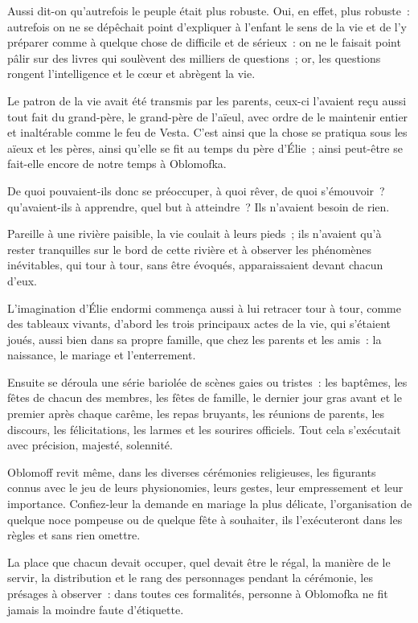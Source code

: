 \documentclass[french,twoside]{book} %
\begin{document}
Aussi dit-on qu’autrefois le peuple était plus robuste. Oui, en effet, plus robuste : autrefois on ne se dépêchait point d’expliquer à l’enfant le sens de la vie et de l’y préparer comme à quelque chose de difficile et de sérieux : on ne le faisait point pâlir sur des livres qui soulèvent des milliers de questions ; or, les questions rongent l’intelligence et le cœur et abrègent la vie.\par
Le patron de la vie avait été transmis par les parents, ceux-ci l’avaient reçu aussi tout fait du grand-père, le grand-père de l’aïeul, avec ordre de le maintenir entier et inaltérable comme le feu de Vesta. C’est ainsi que la chose se pratiqua sous les aïeux et les pères, ainsi qu’elle se fit au temps du père d’Élie ; ainsi peut-être se fait-elle encore de notre temps à Oblomofka.\par
De quoi pouvaient-ils donc se préoccuper, à quoi rêver, de quoi s’émouvoir ? qu’avaient-ils à apprendre, quel but à atteindre ? Ils n’avaient besoin de rien.\par
Pareille à une rivière paisible, la vie coulait à leurs pieds ; ils n’avaient qu’à rester tranquilles sur le bord de cette rivière et à observer les phénomènes inévitables, qui tour à tour, sans être évoqués, apparaissaient devant chacun d’eux.\par
L’imagination d’Élie endormi commença aussi à lui retracer tour à tour, comme des tableaux vivants, d’abord les trois principaux actes de la vie, qui s’étaient joués, aussi bien dans sa propre famille, que chez les parents et les amis : la naissance, le mariage et l’enterrement.\par
Ensuite se déroula une série bariolée de scènes gaies ou tristes : les baptêmes, les fêtes de chacun des membres, les fêtes de famille, le dernier jour gras avant et le premier après chaque carême, les repas bruyants, les réunions de parents, les discours, les félicitations, les larmes et les sourires officiels. Tout cela s’exécutait avec précision, majesté, solennité.\par
Oblomoff revit même, dans les diverses cérémonies religieuses, les figurants connus avec le jeu de leurs physionomies, leurs gestes, leur empressement et leur importance. Confiez-leur la demande en mariage la plus délicate, l’organisation de quelque noce pompeuse ou de quelque fête à souhaiter, ils l’exécuteront dans les règles et sans rien omettre.\par
La place que chacun devait occuper, quel devait être le régal, la manière de le servir, la distribution et le rang des personnages pendant la cérémonie, les présages à observer : dans toutes ces formalités, personne à Oblomofka ne fit jamais la moindre faute d’étiquette.\par
\end{document}
